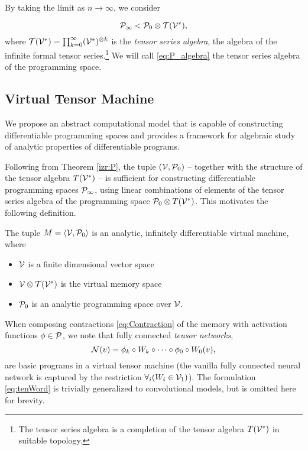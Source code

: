 By taking the limit as $n\to \infty$, we consider 
  
  \begin{equation}
  \label{eq:P_algebra}
        \mathcal{P}_\infty < \mathcal{P}_0\otimes \mathcal{T}(\mathcal{V}^*),
  \end{equation}
where $\mathcal{T}(\mathcal{V}^*)=\prod_{k=0}^\infty (\mathcal{V}^*)^{\otimes k}$ is the \emph{tensor series
  algebra}, the algebra of the infinite formal tensor series.\footnote{The
  tensor series algebra is a completion of the tensor algebra $T(\mathcal{V}^*)$ in suitable topology.} We will call \eqref{eq:P_algebra} the tensor series algebra of the programming space.

\subsection{Virtual Tensor Machine}

We propose an abstract computational model that is capable of constructing differentiable programming spaces and provides a
framework for algebraic study of analytic properties of differentiable programs. 

Following from Theorem \ref{izr:P}, the tuple $(\mathcal{V}, \mathcal{P}_0)$ -- together with the structure of the tensor algebra $T(\mathcal{V}^*)$ -- is sufficient for constructing differentiable programming spaces $\mathcal{P}_\infty$, using linear combinations of elements of the tensor series algebra of the programming space $\mathcal{P}_0\otimes T(\mathcal{V}^*)$. This motivates the following definition.

\begin{definition}\label{def:analyticMachine}
The tuple $M=\langle \mathcal{V},\mathcal{P}_0\rangle$ is an analytic, infinitely  differentiable virtual machine, where
   
    \begin{itemize}
    \item
    $\mathcal{V}$ is a finite dimensional vector space
    \item
    $\mathcal{V}\otimes \mathcal{T}(\mathcal{V}^*)$ is the virtual memory space
    \item
    $\mathcal{P}_0$ is an analytic programming space over $\mathcal{V}$.
    \end{itemize}
  \end{definition}

\noindent When composing contractions \eqref{eq:Contraction} of the memory with activation functions $\phi\in\mathcal{P}$, we note that fully connected \emph{tensor networks},
\begin{equation} \label{eq:tenWord}
\mathcal{N}(v)=\phi_k\circ W_k\circ\cdots\circ\phi_0\circ W_0(v),
\end{equation}
are basic programs in a virtual tensor machine (the vanilla fully connected neural network is  captured by the restriction $\forall_i(W_i\in\mathcal{V}_1)$). The formulation \eqref{eq:tenWord} is trivially generalized to convolutional models, but is omitted here for brevity.


